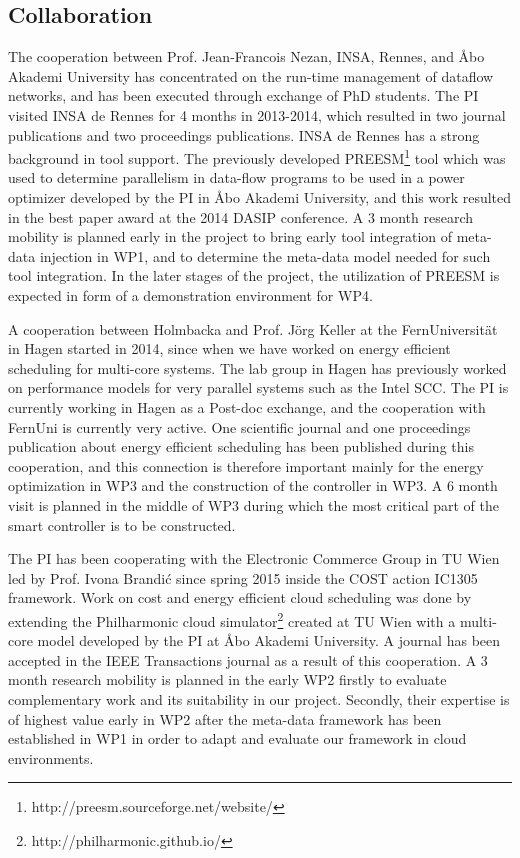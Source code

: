 \documentclass{article}
\begin{document}
\subsection{Collaboration}
The cooperation between Prof. Jean-Francois Nezan, INSA, Rennes, and \AA{}bo Akademi University has concentrated on the run-time management of dataflow networks, 
and has been executed through exchange of PhD students.
The PI visited INSA de Rennes for 4 months in 2013-2014, which resulted in two journal publications and two proceedings publications.\smallskip
INSA de Rennes has a strong background in tool support. 
The previously developed PREESM\footnote{http://preesm.sourceforge.net/website/} tool which was used to determine parallelism in data-flow programs to be used in a power optimizer developed by the PI in \AA{}bo Akademi University, and this work resulted in the best paper award at the 2014 DASIP conference.
A 3 month research mobility is planned early in the project to bring early tool integration of meta-data injection in WP1, and to determine the meta-data model needed for such tool integration.
In the later stages of the project, the utilization of PREESM is expected in form of a demonstration environment for WP4.

A cooperation between Holmbacka and Prof. J\"{o}rg Keller at the FernUniversit\"{a}t in Hagen started in 2014, since when we have worked on energy efficient scheduling for multi-core systems. 
The lab group in Hagen has previously worked on performance models for very parallel systems such as the Intel SCC.
The PI is currently working in Hagen as a Post-doc exchange, and the cooperation with FernUni is currently very active.
One scientific journal and one proceedings publication about energy efficient scheduling has been published during this cooperation,
and this connection is therefore important mainly for the energy optimization in WP3 and the construction of the controller in WP3.
A 6 month visit is planned in the middle of WP3 during which the most critical part of the smart controller is to be constructed.
\smallskip

The PI has been cooperating with the Electronic Commerce Group in TU Wien led by Prof. Ivona Brandi\'{c} since spring 2015 inside the COST action IC1305 framework. 
Work on cost and energy efficient cloud scheduling was done by extending the Philharmonic cloud simulator\footnote{http://philharmonic.github.io/} created at TU Wien with a multi-core model developed by the PI at \AA{}bo Akademi University. 
A journal has been accepted in the IEEE Transactions journal as a result of this cooperation.
A 3 month research mobility is planned in the early WP2 firstly to evaluate complementary work and its suitability in our project.
Secondly, their expertise is of highest value early in WP2 after the meta-data framework has been established in WP1 in order to adapt and evaluate our framework in cloud environments.
\smallskip 
\end{document}
